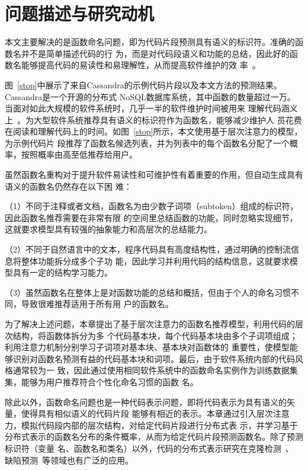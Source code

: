 \section{问题描述与研究动机}\label{motivation3}
本文主要解决的是函数命名问题，即为代码片段预测具有语义的标识符。准确的函数名并不是简单描述代码的行
为，而是对代码段语义和功能的总结，因此好的函数名能够提高代码的易读性和易理解性，从而提高软件维护的效
率~\cite{takang1996effects}。

图~\ref{stop}中展示了来自Cassandra的示例代码片段以及本文方法的预测结果。Cassandra是一个开源的分布式
NoSQL数据库系统，其中函数的数量超过一万。当面对如此大规模的软件系统时，几乎一半的软件维护时间被用来
理解代码涵义上~\cite{corbi1989program}。为大型软件系统推荐具有语义的标识符作为函数名，能够减少维护人
员花费在阅读和理解代码上的时间。如图~\ref{stop}所示，本文使用基于层次注意力的模型，为示例代码片
段推荐了函数名候选列表，并为列表中的每个函数名分配了一个概率，按照概率由高至低推荐给用户。

虽然函数名重构对于提升软件易读性和可维护性有着重要的作用，但自动生成具有语义的函数名仍然存在以下困
难：

（1）不同于注释或者文档，函数名为由少数子词项（subtoken）组成的标识符，因此函数名推荐需要在非常有限
的空间里总结函数的功能，同时忽略实现细节，这就要求模型具有较强的抽象能力和高层次的总结能力。

（2）不同于自然语言中的文本，程序代码具有高度结构性，通过明确的控制流信息将整体功能拆分成多个子功
能，因此学习并利用代码的结构信息，这就要求模型具有一定的结构学习能力。

（3）虽然函数名在整体上是对函数功能的总结和概括，但由于个人的命名习惯不同，导致很难推荐适用于所有用
户的函数名。

为了解决上述问题，本章提出了基于层次注意力的函数名推荐模型，利用代码的层次结构，将函数体拆分为多
个代码基本块，每个代码基本块由多个子词项组成；利用注意力机制分别学习子词项对基本块、基本块对函数体的
重要性，使模型能够识别对函数名预测有益的代码基本块和词项。最后，由于软件系统内部的代码风格通常较为一
致，因此通过使用相同软件系统中的函数命名实例作为训练数据集集，能够为用户推荐符合个性化命名习惯的函数
名。

除此以外，函数命名问题也是一种代码表示问题，即将代码表示为具有语义的矢量，使得具有相似语义的代码片段
能够有相近的表示。本章通过引入层次注意力，模拟代码段内部的层次结构，对给定代码片段进行分布式表
示，并学习基于分布式表示的函数名分布的条件概率，从而为给定代码片段预测函数名。除了预测标识符（变量
名、函数名和类名）以外，代码的分布式表示研究在克隆检测~\cite{white2016deep,allamanis2018learning}、
缺陷预测~\cite{murali2017finding}等领域也有广泛的应用。

